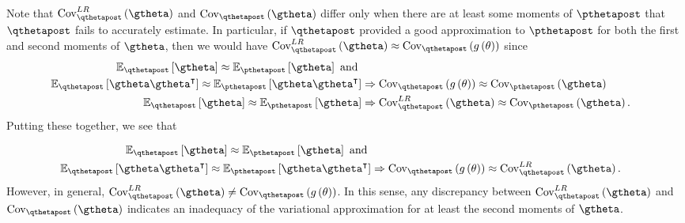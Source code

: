 \documentclass{article}\usepackage[]{graphicx}\usepackage[]{color}
\theoremstyle{plain}
\theoremstyle{definition}
\theoremstyle{plain}
\theoremstyle{plain}
\theoremstyle{plain}
\theoremstyle{plain}
\begin{document}
Note that $\lrvbcov\left(\gtheta\right)$ and $\cov_{\qthetapost}\left(\gtheta\right)$
differ only when there are at least some moments of $\pthetapost$
that $\qthetapost$ fails to accurately estimate. In particular, if
$\qthetapost$ provided a good approximation to $\pthetapost$ for
both the first and second moments of $\gtheta$, then we would have
$\lrvbcov\left(\gtheta\right)\approx\cov_{\qthetapost}\left(g\left(\theta\right)\right)$
since
\begin{align*}
\mbeq\left[\gtheta\right]\approx\epgtheta\textrm{ and }\\
\mbeq\left[\gtheta\gtheta^{\trans}\right]\approx\mbep\left[\gtheta\gtheta^{\trans}\right] & \Rightarrow\cov_{\qthetapost}\left(g\left(\theta\right)\right)\approx\cov_{\pthetapost}\left(\gtheta\right)\\
\mbeq\left[\gtheta\right]\approx\epgtheta & \Rightarrow\lrvbcov\left(\gtheta\right)\approx\cov_{\pthetapost}\left(\gtheta\right).
\end{align*}
Putting these together, we see that

\begin{align*}
\mbeq\left[\gtheta\right]\approx\epgtheta\textrm{ and }\\
\mbeq\left[\gtheta\gtheta^{\trans}\right]\approx\mbep\left[\gtheta\gtheta^{\trans}\right] & \Rightarrow\cov_{\qthetapost}\left(g\left(\theta\right)\right)\approx\lrvbcov\left(\gtheta\right).
\end{align*}
However, in general, $\lrvbcov\left(\gtheta\right)\ne\cov_{\qthetapost}\left(g\left(\theta\right)\right)$.
In this sense, any discrepancy between $\lrvbcov\left(\gtheta\right)$
and $\cov_{\qthetapost}\left(\gtheta\right)$ indicates an inadequacy
of the variational approximation for at least the second moments of
$\gtheta$.
\end{document}
